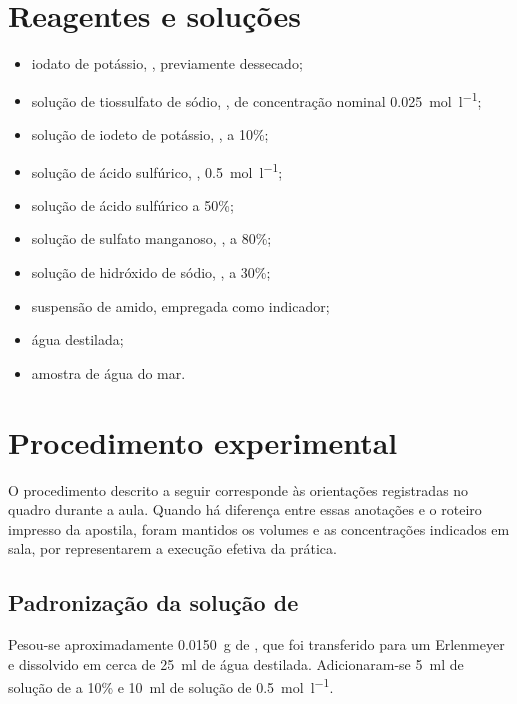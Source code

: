\documentclass[a4paper,12pt]{article}
\begin{document}
\section{Reagentes e soluções}

\begin{itemize}
  \item iodato de potássio, , previamente dessecado;
  \item solução de tiossulfato de sódio, , de concentração
        nominal \qty{0.025}{\mole\per\litre};
  \item solução de iodeto de potássio, , a 10\%;
  \item solução de ácido sulfúrico, ,
        \qty{0.5}{\mole\per\litre};
  \item solução de ácido sulfúrico a 50\%;
  \item solução de sulfato manganoso, , a 80\%;
  \item solução de hidróxido de sódio, , a 30\%;
  \item suspensão de amido, empregada como indicador;
  \item água destilada;
  \item amostra de água do mar.
\end{itemize}

\section{Procedimento experimental}

O procedimento descrito a seguir corresponde às orientações registradas no
quadro durante a aula. Quando há diferença entre essas anotações e o roteiro
impresso da apostila, foram mantidos os volumes e as concentrações indicados
em sala, por representarem a execução efetiva da prática.

\subsection{Padronização da solução de }

Pesou-se aproximadamente \qty{0.0150}{\gram} de , que foi
transferido para um Erlenmeyer e dissolvido em cerca de
\qty{25}{\milli\litre} de água destilada. Adicionaram-se
\qty{5}{\milli\litre} de solução de  a 10\% e
\qty{10}{\milli\litre} de solução de 
\qty{0.5}{\mole\per\litre}.
\end{document}
